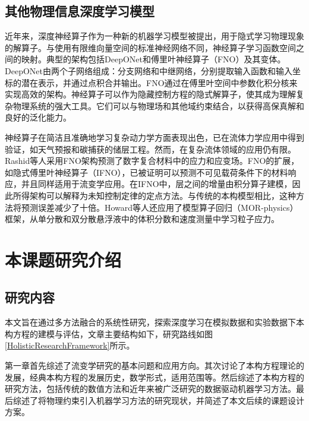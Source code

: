 \subsection{其他物理信息深度学习模型}
近年来，深度神经算子作为一种新的机器学习模型被提出，用于隐式学习物理现象的解算子\cite{luLearningNonlinearOperators2021}。与使用有限维向量空间的标准神经网络不同，神经算子学习函数空间之间的映射。典型的架构包括DeepONet和傅里叶神经算子（FNO）及其变体。DeepONet由两个子网络组成：分支网络和中继网络，分别提取输入函数和输入坐标的潜在表示，并通过点积合并输出。FNO通过在傅里叶空间中参数化积分核来实现高效的架构。神经算子可以作为隐藏控制方程的隐式解算子，使其成为理解复杂物理系统的强大工具。它们可以与物理场和其他域约束结合，以获得高保真解和良好的泛化能力。

神经算子在简洁且准确地学习复杂动力学方面表现出色，已在流体力学应用中得到验证，如天气预报和碳捕获的储层工程。然而，在复杂流体领域的应用仍有限。Rashid等人采用FNO架构预测了数字复合材料中的应力和应变场\cite{rashid2022learning}。FNO的扩展，如隐式傅里叶神经算子（IFNO），已被证明可以预测不可见载荷条件下的材料响应，并且同样适用于流变学应用\cite{you2022learning}。在IFNO中，层之间的增量由积分算子建模，因此所得架构可以解释为未知控制定律的定点方法。与传统的本构模型相比，这种方法将预测误差减少了十倍。Howard等人还应用了模型算子回归（MOR-physics）框架，从单分散和双分散悬浮液中的体积分数和速度测量中学习粒子应力\cite{howardMachineLearningMethods2023}。


\section{本课题研究介绍}
\subsection{研究内容}
本文旨在通过多方法融合的系统性研究，探索深度学习在模拟数据和实验数据下本构方程的建模与评估，文章主要结构如下，研究路线如图\ref{HolisticResearchFramework}所示。

第一章首先综述了流变学研究的基本问题和应用方向。其次讨论了本构方程理论的发展，经典本构方程的发展历史，数学形式，适用范围等。然后综述了本构方程的研究方法，包括传统的数值方法和近年来被广泛研究的数据驱动机器学习方法。最后综述了将物理约束引入机器学习方法的研究现状，并简述了本文后续的课题设计方案。

